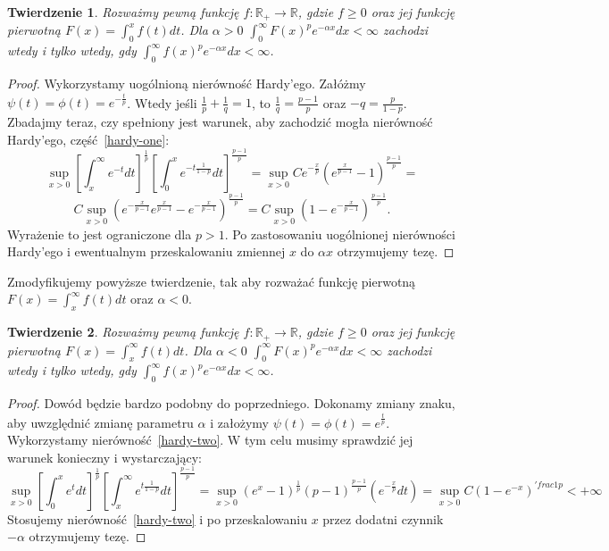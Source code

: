 \documentclass[licencjacka]{pracamgr}
\theoremstyle{definition}
\theoremstyle{definition}
\theoremstyle{plain}
\theoremstyle{plain}
\theoremstyle{plain}
\newtheorem{theorem}{Twierdzenie}[section]
\theoremstyle{plain}
\begin{document}
\begin{theorem}\label{our-hardys-one}
Rozważmy pewną funkcję $f: \mathbb{R}_{+} \rightarrow \mathbb{R}$, gdzie $f
\geq 0$ oraz jej funkcję pierwotną $F(x) = \int_0^{x} f(t) dt$. Dla $\alpha > 0$ 
 $\int_0^\infty F(x)^pe^{- \alpha x}dx < \infty$
zachodzi wtedy i tylko wtedy, gdy
$\int_0^\infty f(x)^p e^{-\alpha x}dx < \infty$.
\end{theorem}
\begin{proof}
Wykorzystamy uogólnioną nierówność Hardy'ego.  Załóżmy $\psi(t) = \phi(t) =
e^{- \frac{t}{p} }$. Wtedy jeśli $\frac{1}{p} + \frac{1}{q} = 1 $, to
$\frac{1}{q} = \frac{p-1}{p}$ oraz $-q = \frac{p}{1-p}$.  Zbadajmy teraz, czy
spełniony jest warunek, aby zachodzić mogła nierówność Hardy'ego, część~\ref{hardy-one}:
$$
\sup_{x > 0}
\left[
\int_x^\infty  
    e^{-t} dt
\right]^{\frac{1}{p}}
\left[
\int_0^x
    e^{-t \frac{1}{1-p}} dt
\right]^{\frac{p-1}{p}}
=
\sup_{x > 0}
    C
    e^{- \frac{x}{p}}
    \left(
        e^{\frac{x}{p-1}} - 1
    \right)^{\frac{p-1}{p}}
=
$$
$$
C
\sup_{x > 0}
    \left(
    e^{- \frac{x}{p-1}}
        e^{\frac{x}{p-1}} -
    e^{- \frac{x}{p-1}}
    \right)^{\frac{p-1}{p}}
=
C
\sup_{x > 0}
    \left(
        1 -
    e^{- \frac{x}{p-1}}
    \right)^{\frac{p-1}{p}}. 
$$
Wyrażenie to jest ograniczone dla $p> 1$. Po zastosowaniu uogólnionej
nierówności Hardy'ego i ewentualnym przeskalowaniu zmiennej $x$ do $\alpha x$
otrzymujemy tezę.
\end{proof}

Zmodyfikujemy powyższe twierdzenie, tak aby rozważać funkcję pierwotną
$F(x) = \int_x^\infty f(t) dt $ oraz $\alpha < 0$.

\begin{theorem}
  Rozważmy pewną funkcję $f: \mathbb{R}_{+} \rightarrow \mathbb{R}$, gdzie
  $f \geq 0$
  oraz jej funkcję pierwotną $F(x) = \int_x^\infty f(t) dt$. Dla $\alpha < 0$ 
 $\int_0^\infty F(x)^pe^{- \alpha x}dx < \infty$
zachodzi wtedy i tylko wtedy, gdy
$\int_0^\infty f(x)^p e^{-\alpha x}dx < \infty$.
\end{theorem}
\begin{proof}
  Dowód będzie bardzo podobny do poprzedniego. Dokonamy zmiany znaku,
  aby uwzględnić zmianę parametru $\alpha$ i 
 założymy $\psi(t) = \phi(t) =
 e^{ \frac{t}{p} }$.
 Wykorzystamy nierówność~\ref{hardy-two}. W tym celu musimy sprawdzić
 jej warunek konieczny i wystarczający:
 \[
\sup_{x > 0}
\left[
\int_0^x e^t dt
\right]^{\frac{1}{p}}
\left[
\int_x^\infty
    e^{t \frac{1}{1-p}} dt
\right]^{\frac{p-1}{p}}
=
\sup_{x > 0}
\left(
  e^x - 1
\right)^{\frac{1}{p}}
(p-1)^{\frac{p-1}{p}}
\left(
    e^{ - \frac{x}{p}} dt
\right)
= 
\sup_{x > 0} C
\left(
  1 - e^{-x}
\right)^{'frac{1}{p}} < +\infty
 \]
 Stosujemy nierówność~\ref{hardy-two} i po przeskalowaniu $x$ przez
 dodatni czynnik $-\alpha$ otrzymujemy tezę.
\end{proof}
\end{document}
